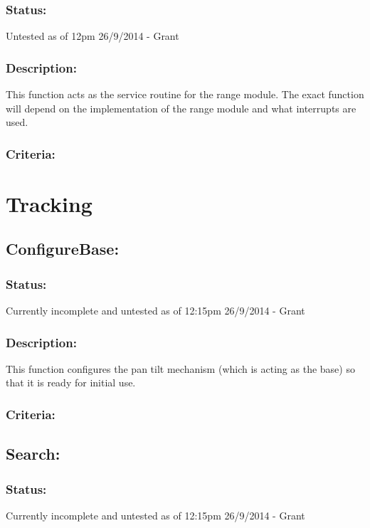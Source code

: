 \documentclass[]{article}
\begin{document}
\subsubsection{Status:}
Untested as of 12pm 26/9/2014 - Grant

\subsubsection{Description:}
This function acts as the service routine for the range module. The exact function will depend on the implementation of the range module and what interrupts are used.

\subsubsection{Criteria:}

\newpage
\section{Tracking}

\subsection{ConfigureBase:}
\subsubsection{Status:}
Currently incomplete and untested as of 12:15pm 26/9/2014 - Grant

\subsubsection{Description:}
This function configures the pan tilt mechanism (which is acting as the base) so that it is ready for initial use.

\subsubsection{Criteria:}

\subsection{Search:}
\subsubsection{Status:}
Currently incomplete and untested as of 12:15pm 26/9/2014 - Grant
\end{document}
